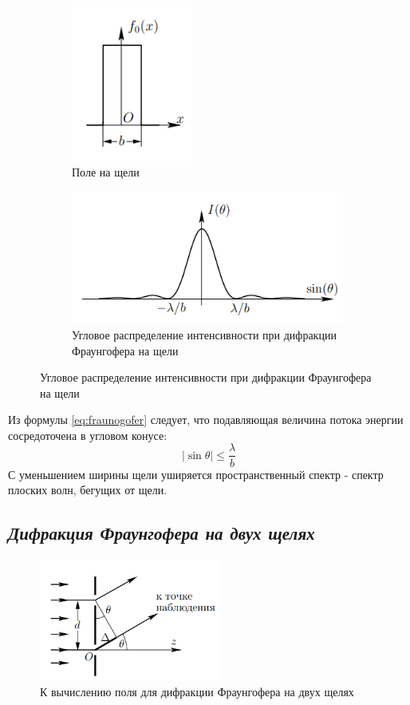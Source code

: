 \begin{figure}[h!]
    \centering
    \begin{subfigure}{0.38\linewidth}
        \centering
        \includegraphics[width=4cm]{images/fraungofer_1.png}
        \caption{Поле на щели}
    \end{subfigure}
    \hfill
    \begin{subfigure}{0.6\linewidth}
        \centering
        \includegraphics[width=9cm]{images/fraungofer_2.png}
        \caption{Угловое распределение интенсивности при дифракции Фраунгофера на щели}
    \end{subfigure}
\end{figure}

\indent Из формулы \ref{eq:fraunogofer} следует, что подавляющая величина потока энергии сосредоточена  в угловом конусе:
\begin{equation}
    |\sin\theta| \le \frac{\lambda}{b}
\end{equation}
С уменьшением ширины щели уширяется пространственный спектр - спектр плоских волн, бегущих от щели.

\subsection*{\textit{Дифракция Фраунгофера на двух щелях}}

\begin{figure}
    \centering
    \includegraphics[width=6cm]{images/fraungofer_theory.png}
    \caption{К вычислению поля для дифракции Фраунгофера на двух щелях}
\end{figure}

